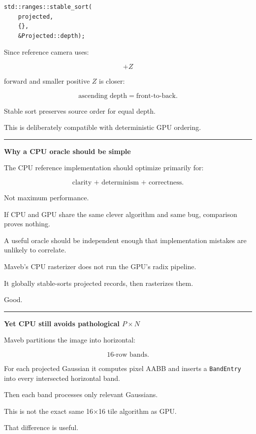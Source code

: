 \begin{verbatim}
std::ranges::stable_sort(
    projected,
    {},
    &Projected::depth);
\end{verbatim}

Since reference camera uses:

\[
+Z
\]

forward and smaller positive \(Z\) is closer:

\[
\boxed{
\text{ascending depth}
=
\text{front-to-back}.
}
\]

Stable sort preserves source order for equal depth.

This is deliberately compatible with deterministic GPU ordering.

\begin{center}\rule{0.5\linewidth}{0.5pt}\end{center}

\textbf{Why a CPU oracle should be simple}

The CPU reference implementation should optimize primarily for:

\[
\boxed{
\text{clarity + determinism + correctness}.
}
\]

Not maximum performance.

If CPU and GPU share the same clever algorithm and same bug, comparison proves nothing.

A useful oracle should be independent enough that implementation mistakes are unlikely to correlate.

Maveb's CPU rasterizer does not run the GPU's radix pipeline.

It globally stable-sorts projected records, then rasterizes them.

Good.

\begin{center}\rule{0.5\linewidth}{0.5pt}\end{center}

\textbf{Yet CPU still avoids pathological \(P\times N\)}

Maveb partitions the image into horizontal:

\[
16\text{-row bands}.
\]

For each projected Gaussian it computes pixel AABB and inserts a \texttt{BandEntry} into every intersected horizontal band.

Then each band processes only relevant Gaussians.

This is not the exact same 16×16 tile algorithm as GPU.

That difference is useful.

